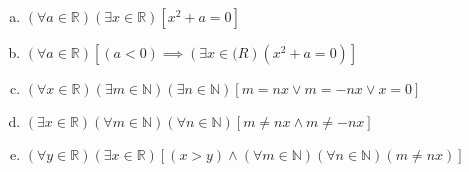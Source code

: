 \documentclass{article}
\begin{document}
\begin{enumerate}[(a)]
\item $(\forall a \in \mathbb{R})(\exists x \in \mathbb{R})[x^2 + a = 0]$
\item $(\forall a \in \mathbb{R})[(a < 0) \implies (\exists x \in \mathbb(R)(x^2 + a = 0)]$
\item $(\forall x \in \mathbb{R})(\exists m \in \mathbb{N})(\exists n \in \mathbb{N})[m = nx \vee m = -nx \vee x = 0]$
\item $(\exists x \in \mathbb{R})(\forall m \in \mathbb{N})(\forall n \in \mathbb{N})[m \neq nx \wedge m \neq -nx]$
\item $(\forall y \in \mathbb{R})(\exists x \in \mathbb{R})[(x > y) \wedge (\forall m \in \mathbb{N})(\forall n \in \mathbb{N})(m \neq nx)]$
\end{enumerate}
\end{document}
